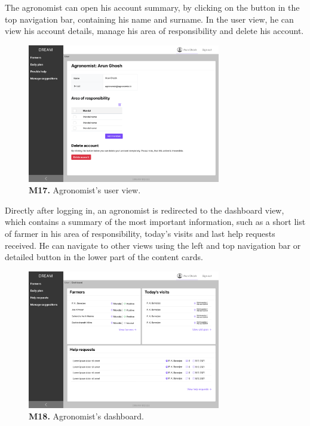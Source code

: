     The agronomist can open his account summary, by clicking on the button in the top navigation bar, containing his name and surname. In the user view, he can view his account details, manage his area of responsibility and delete his account.
    \begin{figure}[H]
        \centering
        \includegraphics[width=0.75\textwidth]{mockups/Agronomist_User.png}
        \caption{\textbf{M17.} Agronomist's user view.}
    \end{figure}
    
    Directly after logging in, an agronomist is redirected to the dashboard view, which contains a summary of the most important information, such as a short list of farmer in his area of responsibility, today’s visits and last help requests received. He can navigate to other views using the left and top navigation bar or detailed button in the lower part of the content cards.
    \begin{figure}[H]
        \centering
        \includegraphics[width=0.75\textwidth]{mockups/Agronomist_Dashboard.png}
        \caption{\textbf{M18.} Agronomist's dashboard.}
    \end{figure}
    
